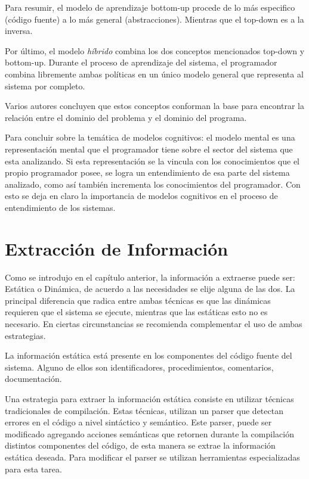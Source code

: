 \documentclass[a4paper,12pt]{report}
\begin{document}
Para resumir, el modelo de aprendizaje bottom-up procede de lo más especifico (código fuente) a lo más general (abstracciones). Mientras que el top-down es a la inversa.

Por último, el modelo \textit{híbrido} combina los dos conceptos mencionados top-down y bottom-up. Durante el proceso de aprendizaje del sistema, el programador combina libremente ambas políticas en un único modelo general que representa al sistema por completo.

Varios autores\cite{TIE89,VMAVA95,BROOK82} concluyen que estos conceptos conforman la base para encontrar la relación entre el dominio del problema y el dominio del programa.

Para concluir sobre la temática de modelos cognitivos: el modelo mental es una representación mental que el programador tiene sobre el sector del sistema que esta analizando. Si esta representación se la vincula con los conocimientos que el propio programador posee, se logra un entendimiento de esa parte del sistema analizado, como así también incrementa los conocimientos del programador. Con esto se deja en claro la importancia de modelos cognitivos en el proceso de entendimiento de los sistemas.%

\section{Extracción de Información}

Como se introdujo en el capítulo anterior, la información a extraerse puede ser: Estática o Dinámica, de acuerdo a las necesidades se elije alguna de las dos. La principal diferencia que radica entre ambas técnicas es que las dinámicas requieren que el sistema se ejecute, mientras que las estáticas esto no es necesario. En ciertas circunstancias se recomienda complementar el uso de ambas estrategias\cite{MBPHRU10}.

La información estática está presente en los componentes del código fuente del sistema. Alguno de ellos son identificadores, procedimientos, comentarios, documentación.

Una estrategia para extraer la información estática consiste en utilizar técnicas tradicionales de compilación\cite{AHUL06}. Estas 
técnicas, utilizan un parser que detectan errores en el código a nivel sintáctico y semántico. Este parser, puede ser modificado agregando acciones semánticas que retornen durante la compilación distintos componentes del código, de esta manera se extrae la información estática deseada. Para modificar el parser se utilizan herramientas especializadas para esta tarea.%
\end{document}
